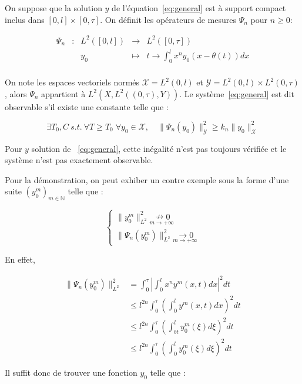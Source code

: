 \documentclass[a4paper]{article}
\begin{document}
On suppose que la solution $y$ de l'équation~\eqref{eq:general} est à support compact inclus dans $[0,l] \times [0,\tau]$. On définit les opérateurs de mesures $\Psi_n$ pour $n \geq 0$:

 \begin{equation}
	\begin{array}{ccccc}
	\Psi_n & : & L^2([0,l]) & \to & L^2([0,\tau]) \\
	 & & y_0 & \mapsto & t \to \int_0^l x^n y_0(x-\theta(t)) dx\\
	\end{array}
\end{equation}

On note les espaces vectoriels normés $\mathscr{X} = L^2 (0,l)$ et $\mathscr{Y} = L^2 (0,l) \times L^2 (0,\tau)$, alors $\Psi_n$ appartient à $L^2(X,L^2((0,\tau),Y))$. Le système~\eqref{eq:general} est dit observable s'il existe une constante telle que :

\begin{equation}
	\label{obs}
	\exists T_0, C \: s. t. \: \forall T \geq T_0 \; \forall y_0 \in \mathscr{X}, \quad \| \Psi_n(y_0)\|_{\mathscr{Y}}^2 \geq k_n \|y_0\|^2_{\mathscr{X}}
\end{equation}

Pour $y$ solution de ~\eqref{eq:general}, cette inégalité n'est pas toujours vérifiée et le système n'est pas exactement observable.

Pour la démonstration, on peut exhiber un contre exemple sous la forme d'une suite $(y_0^m)_{m \in \mathbb{N}}$ telle que :

\[
\begin{cases}
	\|y_0^m\|^2_{L^2} \underset{m\to+\infty}{\nrightarrow 0} \\
	\| \Psi_n (y_0^m)\|_{L^2}^2 \underset{m\to+\infty}{\rightarrow 0}
\end{cases}
\]
	
En effet,

\[ 
\begin{split}
	\| \Psi_n (y_0^m)\|_{L^2}^2  &= \int_0^\tau  |\int_0^l x^n y^m(x,t) dx |^2 dt \\
	                             & \leq l^{2n}  \int_0^\tau (\int_0^l y^m(x,t)dx)^2dt \\
								 & \leq l^{2n} \int_0^\tau (\int_{bt}^l y_0^m(\xi)d\xi)^2dt \\
								 & \leq l^{2n} \int_0^\tau (\int_0^l y_0^m(\xi)d\xi)^2 dt
\end{split}
\]

Il suffit donc de trouver une fonction $y_0$ telle que :
\end{document}
